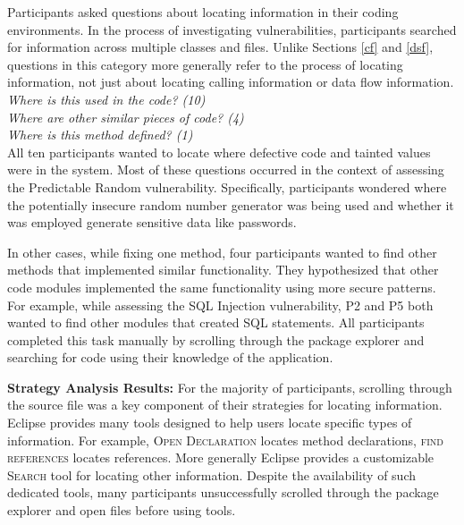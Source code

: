 \documentclass[10pt,journal,compsoc]{IEEEtran}
\begin{document}
Participants asked questions about locating information in their coding environments.
In the process of investigating vulnerabilities, participants searched for information across multiple classes and files.
Unlike Sections \ref{cf} and \ref{dsf}, questions in this category more generally refer to the process of locating information, not just about locating calling information or data flow information.
\\

\noindent\emph{Where is this used in the code? (10)} \\
\emph{Where are other similar pieces of code? (4)} \\
\emph{Where is this method defined? (1)} 
\\

All ten participants wanted to locate where defective code and tainted values were in the system. 
Most of these questions occurred in the context of assessing the Predictable Random vulnerability.
Specifically, participants wondered where the potentially insecure random number generator was being used and whether it was employed generate sensitive data like passwords.

In other cases, while fixing one method, four participants wanted to find other methods that implemented similar functionality.
They hypothesized that other code modules implemented the same functionality using more secure patterns. 
For example, while assessing the SQL Injection vulnerability, P2 and P5 both wanted to find other modules that created SQL statements.
All participants completed this task manually by scrolling through the package explorer and searching for code using their knowledge of the application.



\textbf{Strategy Analysis Results:}
For the majority of participants, scrolling through the source file was a key component of their strategies for locating information.
Eclipse provides many tools designed to help users locate specific types of information.
For example, \textsc{Open Declaration} locates method declarations, \textsc{find references} locates references.
More generally Eclipse provides a customizable \textsc{Search} tool for locating other information.
Despite the availability of such dedicated tools, many participants unsuccessfully scrolled through the package explorer and open files before using tools. 


\end{document}

